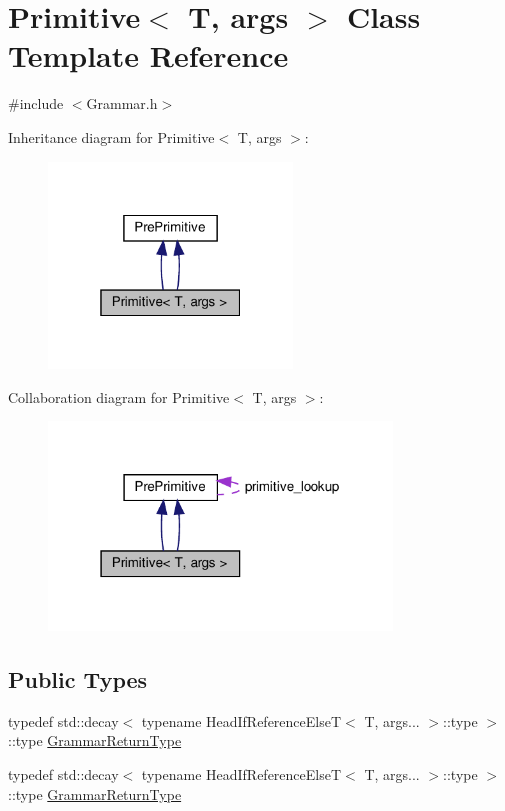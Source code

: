 \hypertarget{struct_primitive}{}\section{Primitive$<$ T, args $>$ Class Template Reference}
\label{struct_primitive}


{\ttfamily \#include $<$Grammar.\+h$>$}



Inheritance diagram for Primitive$<$ T, args $>$\+:\nopagebreak
\begin{figure}[H]
\begin{center}
\leavevmode
\includegraphics[width=184pt]{struct_primitive__inherit__graph}
\end{center}
\end{figure}


Collaboration diagram for Primitive$<$ T, args $>$\+:\nopagebreak
\begin{figure}[H]
\begin{center}
\leavevmode
\includegraphics[width=259pt]{struct_primitive__coll__graph}
\end{center}
\end{figure}
\subsection*{Public Types}
\begin{DoxyCompactItemize}
\item 
typedef std\+::decay$<$ typename Head\+If\+Reference\+ElseT$<$ T, args... $>$\+::type $>$\+::type \hyperlink{struct_primitive_a1f2d2db3fb7869d03d65112e30d22101}{Grammar\+Return\+Type}
\item 
typedef std\+::decay$<$ typename Head\+If\+Reference\+ElseT$<$ T, args... $>$\+::type $>$\+::type \hyperlink{struct_primitive_a1f2d2db3fb7869d03d65112e30d22101}{Grammar\+Return\+Type}
\end{DoxyCompactItemize}
